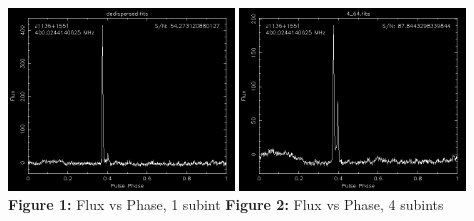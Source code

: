 \documentclass{article_saj}
\begin{document}
\begin{strip}
  \begin{center}
    \includegraphics[width=0.45\textwidth]{Plots/dedispersed.png}
    \hspace{0.04\textwidth}
    \includegraphics[width=0.45\textwidth]{Plots/4_64.png}
    \textbf{Figure 1:} Flux vs Phase, 1 subint \hspace*{3cm} \textbf{Figure 2:} Flux vs Phase, 4 subints
  \end{center}
\end{strip}
\end{document}
